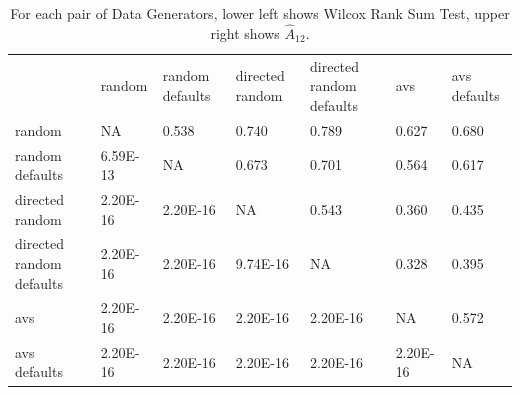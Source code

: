 \begin{table}[h]
\begin{tabular}{lllllll}
                         & random   & random defaults & directed random & directed random defaults & avs      & avs defaults \\
random                   & NA       & 0.538           & 0.740           & 0.789                    & 0.627    & 0.680        \\
random defaults          & 6.59E-13 & NA              & 0.673           & 0.701                    & 0.564    & 0.617        \\
directed random          & 2.20E-16 & 2.20E-16        & NA              & 0.543                    & 0.360    & 0.435        \\
directed random defaults & 2.20E-16 & 2.20E-16        & 9.74E-16        & NA                       & 0.328    & 0.395        \\
avs                      & 2.20E-16 & 2.20E-16        & 2.20E-16        & 2.20E-16                 & NA       & 0.572        \\
avs defaults             & 2.20E-16 & 2.20E-16        & 2.20E-16        & 2.20E-16                 & 2.20E-16 & NA          
\end{tabular}
\caption{For each pair of Data Generators, lower left shows Wilcox Rank
Sum Test, upper right shows $\hat{A}_{12}$.}
\end{table}

